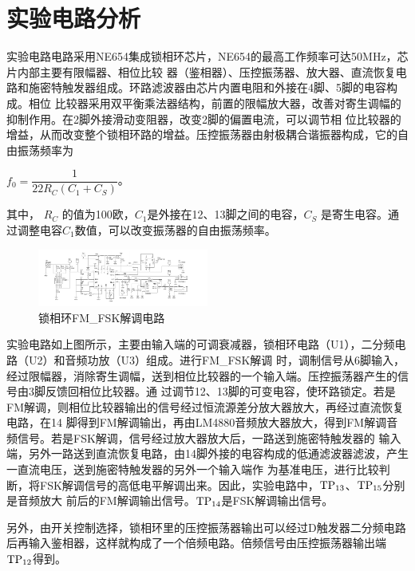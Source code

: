 \documentclass{../source/Experiment}
\begin{document}
    \section{实验电路分析}
    实验电路电路采用NE654集成锁相环芯片，NE654的最高工作频率可达50MHz，芯片内部主要有限幅器、相位比较
    器（鉴相器）、压控振荡器、放大器、直流恢复电路和施密特触发器组成。环路滤波器由芯片内置电阻和外接在4脚、5脚的电容构成。相位
    比较器采用双平衡乘法器结构，前置的限幅放大器，改善对寄生调幅的抑制作用。在2脚外接滑动变阻器，改变2脚的偏置电流，可以调节相
    位比较器的增益，从而改变整个锁相环路的增益。压控振荡器由射极耦合谐振器构成，它的自由振荡频率为
    
    $f_0 = \dfrac{1}{22R_C(C_1 + C_S)}$。
    
    其中， $R_C$ 的值为100欧，$C_1$是外接在12、13脚之间的电容，$C_S$ 是寄生电容。通过调整电容$C_1$数值，可以改变振荡器的自由振荡频率。

    \begin{figure}[H]
        \centering
        \includegraphics[width = 0.5\textwidth]{lab4/1.png}
        \caption{锁相环FM\_FSK解调电路}    
    \end{figure}

    实验电路如上图所示，主要由输入端的可调衰减器，锁相环电路（U1），二分频电路（U2）和音频功放（U3）组成。进行FM\_FSK解调
    时，调制信号从6脚输入，经过限幅器，消除寄生调幅，送到相位比较器的一个输入端。压控振荡器产生的信号由3脚反馈回相位比较器。通
    过调节12、13脚的可变电容，使环路锁定。若是FM解调，则相位比较器输出的信号经过恒流源差分放大器放大，再经过直流恢复电路，在14
    脚得到FM解调输出，再由LM4880音频放大器放大，得到FM解调音频信号。若是FSK解调，信号经过放大器放大后，一路送到施密特触发器的
    输入端，另外一路送到直流恢复电路，由14脚外接的电容构成的低通滤波器滤波，产生一直流电压，送到施密特触发器的另外一个输入端作
    为基准电压，进行比较判断，将FSK解调信号的高低电平解调出来。因此，实验电路中，$\rm TP_{13}$、$\rm TP_{15}$分别是音频放大
    前后的FM解调输出信号。$\rm TP_{14}$是FSK解调输出信号。

    另外，由开关控制选择，锁相环里的压控振荡器输出可以经过D触发器二分频电路后再输入鉴相器，这样就构成了一个倍频电路。倍频信号由压控振荡器输出端$ \rm TP_{12}$得到。
\end{document}
